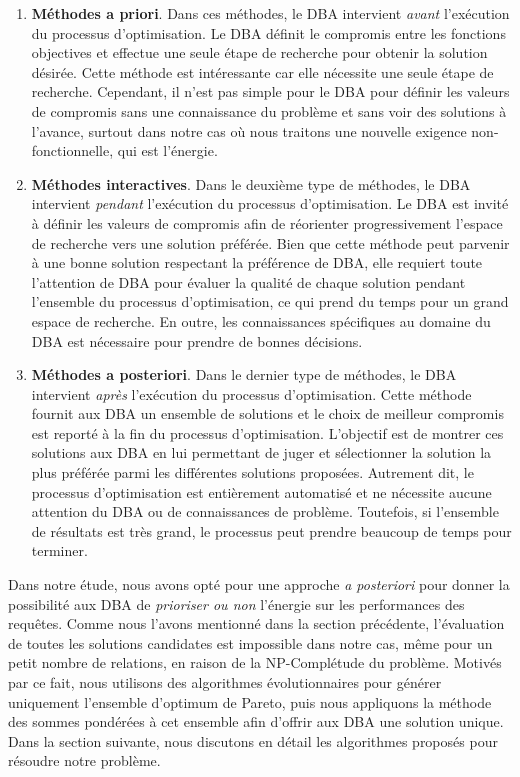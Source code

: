 \begin{enumerate}
 \item \textbf{Méthodes a priori}. Dans ces méthodes, le DBA intervient \textit{avant} l'exécution du processus d'optimisation. Le DBA définit le compromis entre les fonctions objectives et effectue une seule étape de recherche pour obtenir la solution désirée. Cette méthode est intéressante car elle nécessite une seule étape de recherche. Cependant, il n'est pas simple pour le DBA pour définir les valeurs de compromis sans une connaissance du problème et sans voir des solutions à l'avance, surtout dans notre cas où nous traitons une nouvelle exigence non-fonctionnelle, qui est l'énergie.
 \item \textbf{Méthodes interactives}. Dans le deuxième type de méthodes, le DBA intervient \textit{pendant} l'exécution du processus d'optimisation. Le DBA est invité à définir les valeurs de compromis afin de réorienter progressivement l'espace de recherche vers une solution préférée. Bien que cette méthode peut parvenir à une bonne solution respectant la préférence de DBA, elle requiert toute l'attention de DBA pour évaluer la qualité de chaque solution pendant l'ensemble du processus d'optimisation, ce qui prend du temps pour un grand espace de recherche. En outre, les connaissances spécifiques au domaine du DBA est nécessaire pour prendre de bonnes décisions.
 \item \textbf{Méthodes a posteriori}. Dans le dernier type de méthodes, le DBA intervient \textit{après} l'exécution du processus d'optimisation. Cette méthode fournit aux DBA un ensemble de solutions et le choix de meilleur compromis est reporté à la fin du processus d'optimisation. L'objectif est de montrer ces solutions aux DBA en lui permettant de juger et sélectionner la solution la plus préférée parmi les différentes solutions proposées. Autrement dit, le processus d'optimisation est entièrement automatisé et ne nécessite aucune attention du DBA ou de connaissances de problème. Toutefois, si l'ensemble de résultats est très grand, le processus peut prendre beaucoup de temps pour terminer.
\end{enumerate}

Dans notre étude, nous avons opté pour une approche \textit{a posteriori} pour donner la possibilité aux DBA de \textit{prioriser ou non} l'énergie sur les performances des requêtes. Comme nous l'avons mentionné dans la section précédente, l'évaluation de toutes les solutions candidates est impossible dans notre cas, même pour un petit nombre de relations, en raison de la NP-Complétude du problème. Motivés par ce fait, nous utilisons des algorithmes évolutionnaires pour générer uniquement l'ensemble d'optimum de Pareto, puis nous appliquons la méthode des sommes pondérées à cet ensemble afin d'offrir aux DBA une solution unique. Dans la section suivante, nous discutons en détail les algorithmes proposés pour résoudre notre problème.

